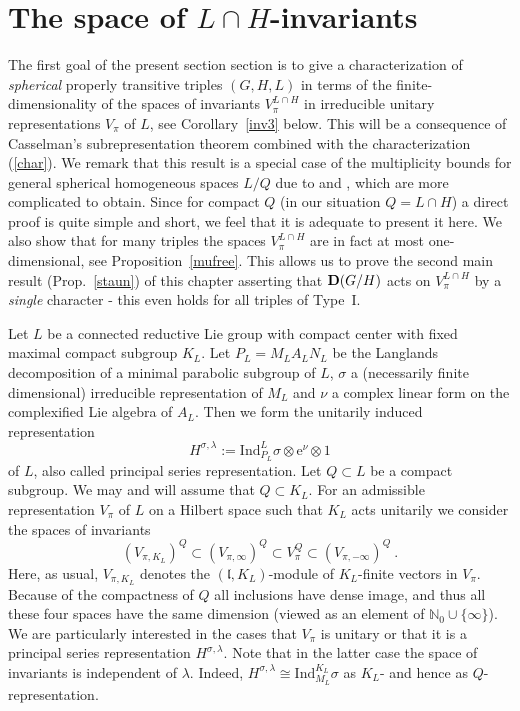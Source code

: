 \documentclass[10]{amsart}
\theoremstyle{remark}
\theoremstyle{definition}
\numberwithin{equation}{section}
\newcommand{\e}{\text{e}}               %
\newcommand{\N}{\mathbb{N}}           %
\newcommand{\Ind}{\text{Ind}}
\newcommand{\fl}{{\mathfrak l}}
\begin{document}
{\section{The space of $L\cap H$-invariants}\label{invariants}

The first goal of the present section section is to give a characterization of {\em spherical} properly transitive triples $(G,H,L)$  in terms of the finite-dimensionality of the spaces of invariants
$V_\pi^{L\cap H}$ in irreducible unitary representations $V_\pi$ of $L$, see Corollary~\ref{inv3} below. This will be a consequence of Casselman's subrepresentation theorem
combined with the characterization (\ref{char}). We remark that this result is a special case of the multiplicity bounds for general spherical homogeneous spaces $L/Q$
due to \cite{KO13} and \cite{KS16}, which are more complicated to obtain. Since for compact $Q$ (in our situation $Q=L\cap H$) a direct proof is quite simple and short, we feel that it is
adequate to present it here. 
We also show that for many triples the spaces $V_\pi^{L\cap H}$ are in fact at most one-dimensional, see Proposition~\ref{mufree}. This allows us to prove the second main result (Prop.~\ref{staun}) of this chapter asserting that ${\bf D}(G/H)$ acts on $V_\pi^{L\cap H}$ by a {\em single} character - this even holds for all triples of Type~I. 


Let $L$ be a connected reductive Lie group with compact center with fixed maximal compact subgroup $K_L$. Let $P_{L}=M_{L}A_{L}N_{L}$ be the Langlands decomposition of a minimal parabolic subgroup of $L$, 
$\sigma$ a (necessarily finite dimensional) irreducible representation of $M_{L}$ and $\nu$ a complex linear form on the complexified Lie algebra of $A_{L}$. 
Then we form the unitarily induced representation 
$$ H^{\sigma,\lambda}:=\Ind_{P_{L}}^{L}\sigma\otimes\e^{\nu}\otimes 1$$
of $L$, also called principal series representation. Let $Q\subset L$ be a compact subgroup. We may and will assume that $Q\subset K_L$.
For an admissible representation $V_\pi$ of $L$ on a Hilbert space such that $K_L$ acts unitarily we consider the spaces of invariants
$$  ( V_{\pi,K_L})^Q \subset ( V_{\pi,\infty})^Q \subset V_{\pi}^Q\subset (V_{\pi,-\infty})^Q\ .$$
Here, as usual, $V_{\pi,K_L}$ denotes the $(\fl,K_L)$-module of $K_L$-finite vectors in $V_\pi$. Because of the compactness of $Q$ all inclusions have dense image, and thus all these four spaces have the same dimension (viewed as an element of $\N_0\cup\{\infty\}$).
We are particularly interested in the cases that $V_\pi$ is unitary or that it is a principal series representation $ H^{\sigma,\lambda}$. Note that in the latter case
the space of invariants is independent of $\lambda$. Indeed,  $H^{\sigma,\lambda}\cong\Ind_{M_{L}}^{K_L}\sigma$ as $K_L$- and hence as $Q$-representation.

}
\end{document}
